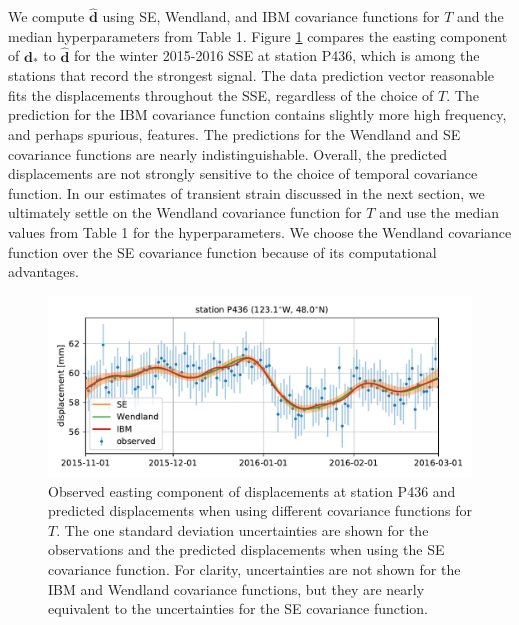 We compute $\hat{\mathbf{d}}$ using SE, Wendland, and IBM covariance
functions for $T$ and the median hyperparameters from Table 1. Figure
\ref{ch5:fig:Fit} compares the easting component of $\mathbf{d}_*$ to
$\hat{\mathbf{d}}$ for the winter 2015-2016 SSE at station P436, which
is among the stations that record the strongest signal. The data
prediction vector reasonable fits the displacements throughout the
SSE, regardless of the choice of $T$. The prediction for the IBM
covariance function contains slightly more high frequency, and perhaps
spurious, features. The predictions for the Wendland and SE covariance
functions are nearly indistinguishable. Overall, the predicted
displacements are not strongly sensitive to the choice of temporal
covariance function. In our estimates of transient strain discussed in
the next section, we ultimately settle on the Wendland covariance
function for $T$ and use the median values from Table 1 for the
hyperparameters. We choose the Wendland covariance function over the
SE covariance function because of its computational advantages.

\begin{figure}
\includegraphics{ch5/figures/signal_fit/signal-fit.pdf}
\caption{Observed easting component of displacements at station P436
and predicted displacements when using different covariance functions
for $T$. The one standard deviation uncertainties are shown for the
observations and the predicted displacements when using the SE
covariance function. For clarity, uncertainties are not shown for the
IBM and Wendland covariance functions, but they are nearly equivalent
to the uncertainties for the SE covariance function.}
\label{ch5:fig:Fit}
\end{figure}

